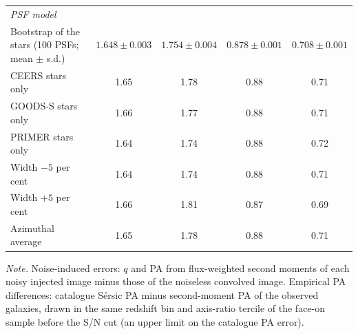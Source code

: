 \documentclass[fleqn,usenatbib]{mnras}
\begin{document}
\begin{table}
\begin{tabular}{lcccc}
\multicolumn{5}{l}{\textit{PSF model}}\\
Bootstrap of the stars (100 PSFs; mean $\pm$ s.d.) & $1.648\pm0.003$ & $1.754\pm0.004$ & $0.878\pm0.001$ & $0.708\pm0.001$\\
CEERS stars only                                  & 1.65 & 1.78 & 0.88 & 0.71\\
GOODS-S stars only                                & 1.66 & 1.77 & 0.88 & 0.71\\
PRIMER stars only                                 & 1.64 & 1.74 & 0.88 & 0.72\\
Width $-5$ per cent                               & 1.64 & 1.74 & 0.88 & 0.71\\
Width $+5$ per cent                               & 1.66 & 1.81 & 0.87 & 0.69\\
Azimuthal average                                 & 1.65 & 1.78 & 0.88 & 0.71\\
\hline
\end{tabular}
\par\vspace{2pt}\begin{minipage}{\textwidth}\footnotesize\textit{Note.} Noise-induced errors: $q$ and PA from flux-weighted second
moments of each noisy injected image minus those of the noiseless convolved
image. Empirical PA differences: catalogue S\'ersic PA minus second-moment PA
of the observed galaxies, drawn in the same redshift bin and axis-ratio
tercile of the face-on sample before the S/N cut (an upper limit on the
catalogue PA error).\end{minipage}
\end{table}
\end{document}
